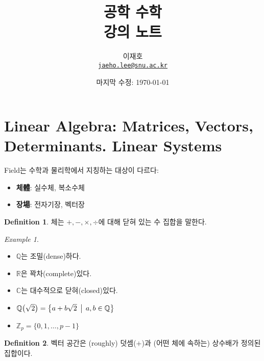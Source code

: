 \documentclass[unfonts,oneside,a4paper]{oblivoir}
\title{공학 수학\\강의 노트}
\author{이재호\\\href{mailto:jaeho.lee@snu.ac.kr}{\texttt{jaeho.lee@snu.ac.kr}}}
\date{마지막 수정: \today}
\theoremstyle{definition}
\newtheorem{definition}{Definition}
\theoremstyle{theorem}
\theoremstyle{remark}
\theoremstyle{remark}
\theoremstyle{remark}
\newtheorem*{example}{Example}
\theoremstyle{remark}
\begin{document}
\maketitle

\setcounter{section}{6}
\reversemarginpar{}
\section{Linear Algebra: Matrices, Vectors, Determinants. Linear Systems}

Field는 수학과 물리학에서 지칭하는 대상이 다르다:
\begin{itemize}
    \item \textbf{체體}: 실수체, 복소수체
    \item \textbf{장場}: 전자기장, 벡터장
\end{itemize}

\begin{definition}
    체는 $+, -, \times, \div$에 대해 닫혀 있는 수 집합을 말한다.
\end{definition}

\begin{example}
    \leavevmode
    \begin{itemize}
        \item $\mathbb Q$는 조밀(dense)하다.
        \item $\mathbb R$은 꽉차(complete)있다.
        \item $\mathbb C$는 대수적으로 닫혀(closed)있다.
        \item $\mathbb Q \bigl(\sqrt 2\bigr) = \bigl\{a + b \sqrt 2\,\bigm|\,a, b \in \mathbb Q\bigr\}$
        \item $\mathbb Z_p = \{0, 1, \dots, p - 1\}$
    \end{itemize}
\end{example}

\begin{definition}
    벡터 공간은 (roughly) 덧셈($+$)과 (어떤 체에 속하는) 상수배가 정의된 집합이다.
\end{definition}
\end{document}
